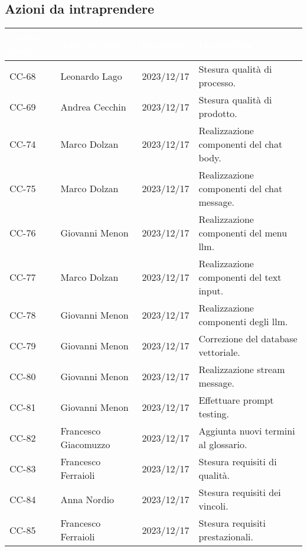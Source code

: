 \subsection{Azioni da intraprendere}
{
    \setlength{\tabcolsep}{10pt}
    \renewcommand{\arraystretch}{1.5}
    \begin{xltabular}{\textwidth}{| l | l | l | X |}
        \hline
        \textbf{\textcolor{white}{Codice issue}} & \textbf{\textcolor{white}{Assegnatario}} & \textbf{\textcolor{white}{Scadenza}} & \textbf{\textcolor{white}{Descrizione}} \\
        \endhead
        \hline
        CC-68 & Leonardo Lago & 2023/12/17 & Stesura qualità di processo. \\
        \hline
        CC-69 & Andrea Cecchin & 2023/12/17 & Stesura qualità di prodotto. \\
        \hline
        CC-74 & Marco Dolzan & 2023/12/17 & Realizzazione componenti del chat body.  \\
        \hline
        CC-75 & Marco Dolzan & 2023/12/17 & Realizzazione componenti del chat message. \\
        \hline
        CC-76 & Giovanni Menon & 2023/12/17 & Realizzazione componenti del menu llm.\\
        \hline
        CC-77 & Marco Dolzan & 2023/12/17 & Realizzazione componenti del text input.\\
        \hline
        CC-78 & Giovanni Menon & 2023/12/17 & Realizzazione componenti degli llm.\\
        \hline
        CC-79 & Giovanni Menon & 2023/12/17 & Correzione del database vettoriale. \\
        \hline
        CC-80 & Giovanni Menon & 2023/12/17 & Realizzazione stream message. \\
        \hline
        CC-81 & Giovanni Menon & 2023/12/17 & Effettuare prompt testing. \\
        \hline
        CC-82 & Francesco Giacomuzzo & 2023/12/17 & Aggiunta nuovi termini al glossario. \\ 
        \hline
        CC-83 & Francesco Ferraioli & 2023/12/17 & Stesura requisiti di qualità. \\
        \hline
        CC-84 & Anna Nordio & 2023/12/17 & Stesura requisiti dei vincoli. \\
        \hline
        CC-85 & Francesco Ferraioli & 2023/12/17 & Stesura requisiti prestazionali. \\

\end{xltabular}}
